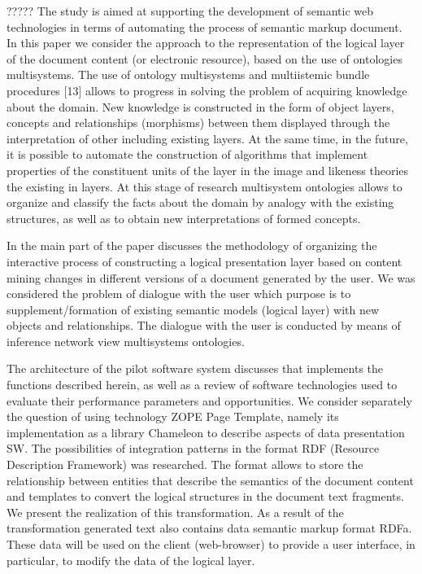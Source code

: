 \documentclass[conference]{IEEEtran}
\begin{document}
????? The study is aimed at supporting the development of semantic web technologies in terms of automating the process of semantic markup document. In this paper we consider the approach to the representation of the logical layer of the document content (or electronic resource), based on the use of ontologies multisystems. The use of ontology multisystems and multiistemic bundle procedures [13] allows to progress in solving the problem of acquiring knowledge about the domain. New knowledge is constructed in the form of object layers, concepts and relationships (morphisms) between them displayed through the interpretation of other including existing layers. At the same time, in the future, it is possible to automate the construction of algorithms that implement properties of the constituent units of the layer in the image and likeness theories the existing in layers. At this stage of research multisystem ontologies allows  to organize and classify the facts about the domain by analogy with the existing structures, as well as to obtain new interpretations of formed concepts.

	In the main part of the paper discusses the methodology of organizing the interactive process of constructing a logical presentation layer based on content mining changes in different versions of a document generated by the user. We was considered the problem of dialogue with the user which purpose is to supplement/formation of existing semantic models (logical layer) with new objects and relationships. The dialogue with the user is conducted by means of inference network view multisystems ontologies.

	The architecture of the pilot software system discusses that implements the functions described herein, as well as a review of software technologies used to evaluate their performance parameters and opportunities. We consider separately the question of using technology ZOPE Page Template, namely its implementation as a library Chameleon to describe aspects of data presentation SW. The possibilities of integration patterns in the format RDF (Resource Description Framework) was researched. The format allows to store the relationship between entities that describe the semantics of the document content and templates to convert the logical structures in the document text fragments. We present the realization of this transformation. As a result of the transformation generated text also contains data semantic markup format RDFa. These data will be used on the client (web-browser) to provide a user interface, in particular, to modify the data of the logical layer.
\end{document}
